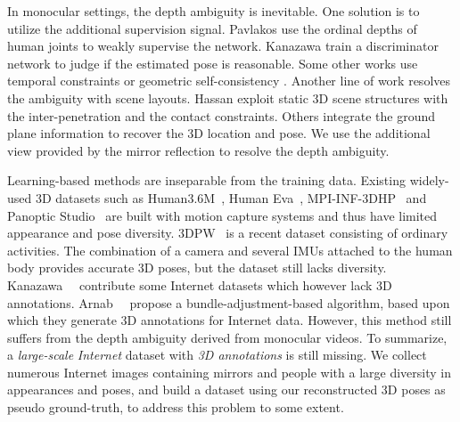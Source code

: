In monocular settings, the depth ambiguity is inevitable. One solution is to utilize the additional supervision signal. Pavlakos \etal \cite{pavlakos2018ordinal} use the ordinal depths of human joints to weakly supervise the network. Kanazawa \etal \cite{hmrKanazawa17} train a discriminator network to judge if the estimated pose is reasonable. Some other works use temporal constraints \cite{kocabas2019vibe, tripathi2020posenet3d, peng2021neural} or geometric self-consistency \cite{chen2019unsupervised}.
Another line of work resolves the ambiguity with scene layouts. Hassan \etal \cite{PROX:2019} exploit static 3D scene structures with the inter-penetration and the contact constraints. Others \cite{mehta2019xnect, zanfir2018monocular} integrate the ground plane information to recover the 3D location and pose. We use the additional view provided by the mirror reflection to resolve the depth ambiguity.

Learning-based methods are inseparable from the training data. Existing widely-used 3D datasets such as Human3.6M~\cite{h36m_pami}, Human Eva~\cite{Sigal:IJCV:10b}, 
MPI-INF-3DHP~\cite{mono-3dhp2017} and Panoptic Studio~\cite{Joo_2017_TPAMI} are built with motion capture systems and thus have limited appearance and pose diversity. 3DPW~\cite{vonMarcard2018} is a recent dataset consisting of ordinary activities. The combination of a camera and several IMUs attached to the human body provides accurate 3D poses, but the dataset still lacks diversity. Kanazawa~\etal~\cite{humanMotionKanazawa19} contribute some Internet datasets which however lack 3D annotations. Arnab~\etal~\cite{Arnab_CVPR_2019} propose a bundle-adjustment-based algorithm, based upon which they generate 3D annotations for Internet data. However, this method still suffers from the depth ambiguity derived from monocular videos. To summarize, a \textit{large-scale} \textit{Internet} dataset with \textit{3D annotations} is still missing. We collect numerous Internet images containing mirrors and people with a large diversity in appearances and poses, and build a dataset using our reconstructed 3D poses as pseudo ground-truth, to address this problem to some extent.

